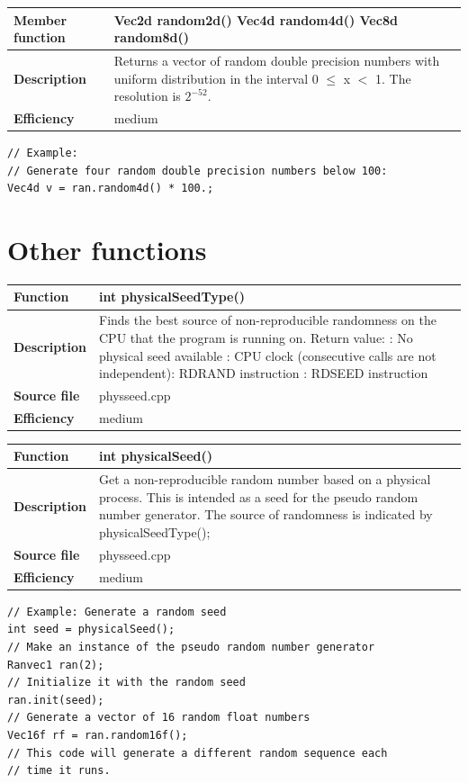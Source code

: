 \documentclass[11pt,a4paper,oneside,openright]{report}
\newcommand{\vspacebig}{\vspace{6mm}}
\begin{document}
\begin{tabular}{|p{30mm}|p{100mm}|}
\hline
\bfseries Member function & Vec2d random2d() \newline
Vec4d random4d() \newline
Vec8d random8d() \\ \hline
\bfseries Description & Returns a vector of random double precision numbers with uniform distribution in the interval 0 $\leq$ x $<$ 1. The resolution is $2^{-52}$.  \\ \hline
\bfseries Efficiency & medium \\ \hline
\end{tabular}
\begin{lstlisting}[frame=none]
// Example:
// Generate four random double precision numbers below 100:
Vec4d v = ran.random4d() * 100.;
\end{lstlisting}
\vspacebig


\section{Other functions}\label{OtherFunctions}

\begin{tabular}{|p{30mm}|p{100mm}|}
\hline
\bfseries Function & int physicalSeedType()  \\ \hline
\bfseries Description & Finds the best source of non-reproducible randomness on the CPU that the program is running on. Return value: \newline
0:  No physical seed available \newline
1:  CPU clock (consecutive calls are not independent)\newline
2:  RDRAND instruction \newline
3:  RDSEED instruction   \\ \hline
\bfseries Source file & physseed.cpp \\ \hline
\bfseries Efficiency & medium \\ \hline
\end{tabular}
\vspacebig

\begin{tabular}{|p{30mm}|p{100mm}|}
\hline
\bfseries Function & int physicalSeed()  \\ \hline
\bfseries Description & Get a non-reproducible random number based on a physical process. This is intended as a seed for the pseudo random number generator. The source of randomness is indicated by physicalSeedType();  \\ \hline
\bfseries Source file & physseed.cpp \\ \hline
\bfseries Efficiency & medium \\ \hline
\end{tabular}
\begin{lstlisting}[frame=none]
// Example: Generate a random seed
int seed = physicalSeed();
// Make an instance of the pseudo random number generator
Ranvec1 ran(2);
// Initialize it with the random seed
ran.init(seed);
// Generate a vector of 16 random float numbers
Vec16f rf = ran.random16f();
// This code will generate a different random sequence each
// time it runs.
\end{lstlisting}
\vspacebig
\end{document}
